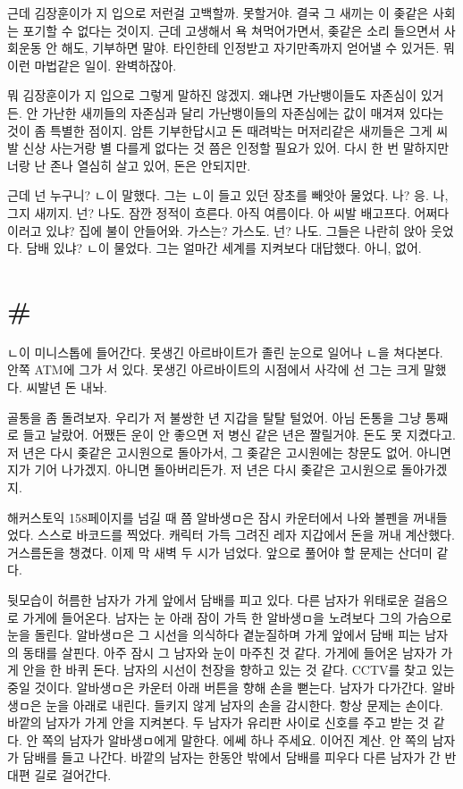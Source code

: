 \documentclass[a5paper,10pt, twoside, openright]{memoir}
\begin{document}
	근데 김장훈이가 지 입으로 저런걸 고백할까. 못할거야. 결국 그 새끼는 이 좆같은 사회는 포기할 수 없다는 것이지. 근데 고생해서 욕 쳐먹어가면서, 좆같은 소리 들으면서 사회운동 안 해도, 기부하면 말야. 타인한테 인정받고 자기만족까지 얻어낼 수 있거든. 뭐 이런 마법같은 일이. 완벽하잖아.

	뭐 김장훈이가 지 입으로 그렇게 말하진 않겠지. 왜냐면 가난뱅이들도 자존심이 있거든. 안 가난한 새끼들의 자존심과 달리 가난뱅이들의 자존심에는 값이 매겨져 있다는 것이 좀 특별한 점이지. 암튼 기부한답시고 돈 때려박는 머저리같은 새끼들은 그게 씨발 신상 사는거랑 별 다를게 없다는 것 쯤은 인정할 필요가 있어. 다시 한 번 말하지만 너랑 난 존나 열심히 살고 있어, 돈은 안되지만. 

	근데 넌 누구니? ㄴ이 말했다. 그는 ㄴ이 들고 있던 장초를 빼앗아 물었다. 나? 응. 나, 그지 새끼지. 넌? 나도. 잠깐 정적이 흐른다. 아직 여름이다. 아 씨발 배고프다. 어쩌다 이러고 있냐? 집에 불이 안들어와. 가스는? 가스도. 넌? 나도. 그들은 나란히 앉아 웃었다. 담배 있냐? ㄴ이 물었다. 그는 얼마간 세계를 지켜보다 대답했다. 아니, 없어. 

	\section{\#}
	ㄴ이 미니스톱에 들어간다. 못생긴 아르바이트가 졸린 눈으로 일어나 ㄴ을 쳐다본다. 안쪽 ATM에 그가 서 있다. 못생긴 아르바이트의 시점에서 사각에 선 그는 크게 말했다. 씨발년 돈 내놔. 

	골통을 좀 돌려보자. 우리가 저 불쌍한 년 지갑을 탈탈 털었어. 아님 돈통을 그냥 통째로 들고 날랐어. 어쨌든 운이 안 좋으면 저 병신 같은 년은 짤릴거야. 돈도 못 지켰다고. 저 년은 다시 좆같은 고시원으로 돌아가서, 그 좆같은 고시원에는 창문도 없어. 아니면 지가 기어 나가겠지. 아니면 돌아버리든가. 저 년은 다시 좆같은 고시원으로 돌아가겠지.

	해커스토익 158페이지를 넘길 때 쯤 알바생ㅁ은 잠시 카운터에서 나와 볼펜을 꺼내들었다. 스스로 바코드를 찍었다. 캐릭터 가득 그려진 레자 지갑에서 돈을 꺼내 계산했다. 거스름돈을 챙겼다. 이제 막 새벽 두 시가 넘었다. 앞으로 풀어야 할 문제는 산더미 같다. 

	뒷모습이 허름한 남자가 가게 앞에서 담배를 피고 있다. 다른 남자가 위태로운 걸음으로 가게에 들어온다. 남자는 눈 아래 잠이 가득 한 알바생ㅁ을 노려보다 그의 가슴으로 눈을 돌린다. 알바생ㅁ은 그 시선을 의식하다 곁눈질하며 가게 앞에서 담배 피는 남자의 동태를 살핀다. 아주 잠시 그 남자와 눈이 마주친 것 같다. 가게에 들어온 남자가 가게 안을 한 바퀴 돈다. 남자의 시선이 천장을 향하고 있는 것 같다. CCTV를 찾고 있는 중일 것이다. 알바생ㅁ은 카운터 아래 버튼을 향해 손을 뻗는다. 남자가 다가간다. 알바생ㅁ은 눈을 아래로 내린다. 들키지 않게 남자의 손을 감시한다. 항상 문제는 손이다. 바깥의 남자가 가게 안을 지켜본다. 두 남자가 유리판 사이로 신호를 주고 받는 것 같다. 안 쪽의 남자가 알바생ㅁ에게 말한다. 에쎄 하나 주세요. 이어진 계산. 안 쪽의 남자가 담배를 들고 나간다. 바깥의 남자는 한동안 밖에서 담배를 피우다 다른 남자가 간 반대편 길로 걸어간다. 
\end{document}
